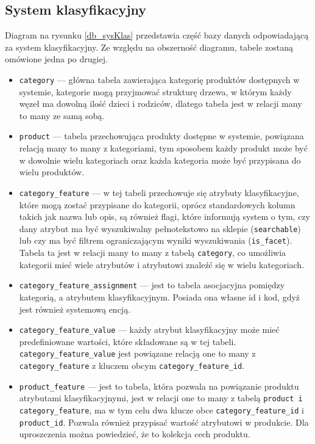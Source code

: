 \subsection{System klasyfikacyjny}
Diagram na rysunku \ref{db_sysKlas} przedstawia część bazy danych odpowiadającą za system klasyfikacyjny. Ze względu na obszerność diagramu, tabele zostaną omówione jedna po drugiej. 
\begin{itemize}
	\item \texttt{category} — główna tabela zawierająca kategorię produktów dostępnych w systemie, kategorie mogą przyjmować strukturę drzewa, w którym każdy węzeł ma dowolną ilość dzieci i rodziców, dlatego tabela jest w relacji many to many ze samą sobą. 
	\item \texttt{product} — tabela przechowująca produkty dostępne w systemie, powiązana relacją many to many z kategoriami, tym sposobem każdy produkt może być w dowolnie wielu kategoriach oraz każda kategoria może być przypisana do wielu produktów. 
	\item \texttt{category\_feature} — w tej tabeli przechowuje się atrybuty klasyfikacyjne, które mogą zostać przypisane do kategorii, oprócz standardowych kolumn takich jak nazwa lub opis, są również flagi, które informują system o tym, czy dany atrybut ma być wyszukiwalny pełnotekstowo na sklepie (\texttt{searchable}) lub czy ma być filtrem ograniczającym wyniki wyszukiwania (\texttt{is\_facet}). Tabela ta jest w relacji many to many z tabelą \texttt{category}, co umożliwia kategorii mieć wiele atrybutów i atrybutowi znaleźć się w wielu kategoriach.
	\item \texttt{category\_feature\_assignment} — jest to tabela asocjacyjna pomiędzy kategorią, a atrybutem klasyfikacyjnym. Posiada ona własne id i kod, gdyż jest również systemową encją.
	\item \texttt{category\_feature\_value} — każdy atrybut klasyfikacyjny może mieć predefiniowane wartości, które składowane są w tej tabeli. \texttt{category\_feature\_value} jest powiązane relacją one to many z \texttt{category\_feature} z kluczem obcym \texttt{category\_feature\_id}.
	\item \texttt{product\_feature} — jest to tabela, która pozwala na powiązanie produktu atrybutami klasyfikacyjnymi, jest w relacji one to many z tabelą \texttt{product i category\_feature}, ma w tym celu dwa klucze obce  \texttt{category\_feature\_id} i  \texttt{product\_id}. Pozwala również przypisać wartość atrybutowi w produkcie. Dla uproszczenia można powiedzieć, że to kolekcja cech produktu. 
\end{itemize}
